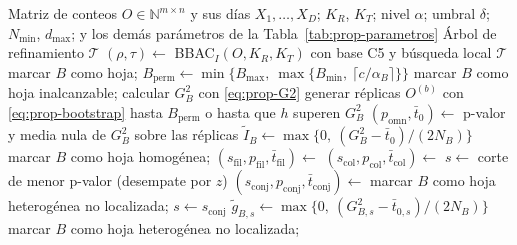 \begin{algorithm}[t]
\caption{Refinamiento jerárquico de ST-CC con AST-CC}\label{alg:astcc}
\begin{algorithmic}[1]
\Require Matriz de conteos $O\in\mathbb{N}^{m\times n}$ y sus días $X_1,\dots,X_D$; $K_R$, $K_T$; nivel $\alpha$; umbral $\delta$; $N_{\min}$, $d_{\max}$; y los demás parámetros de la Tabla~\ref{tab:prop-parametros}
\Ensure Árbol de refinamiento $\mathcal{T}$
\State $(\rho,\tau)\gets$ BBAC$_I(O, K_R, K_T)$ con base C5 y búsqueda local 
  \State {}
\EndFor
\State \Return $\mathcal{T}$
\Statex
{}
    \State marcar $B$ como hoja; \Return
  \EndIf
  \State $B_{\mathrm{perm}}\gets\min\{B_{\max},\ \max\{B_{\min},\ \lceil c/\alpha_B\rceil\}\}$
    \State marcar $B$ como hoja inalcanzable; \Return
  \EndIf
  \State calcular $G^2_B$ con \eqref{eq:prop-G2}
  \State generar réplicas $O^{(b)}$ con \eqref{eq:prop-bootstrap} hasta $B_{\mathrm{perm}}$ o hasta que $h$ superen $G^2_B$ 
  \State $(p_{\mathrm{omn}}, \bar t_0)\gets$ p-valor y media nula de $G^2_B$ sobre las réplicas
  \State $\tilde I_B\gets\max\{0,\ (G^2_B-\bar t_0)/(2N_B)\}$
    \State marcar $B$ como hoja homogénea; \Return
  \EndIf
  \State $(s_{\mathrm{fil}},p_{\mathrm{fil}},\bar t_{\mathrm{fil}})\gets$ 
  \State $(s_{\mathrm{col}},p_{\mathrm{col}},\bar t_{\mathrm{col}})\gets$ 
    \State $s\gets$ corte de menor p-valor (desempate por $z$)
  \Else
    \State $(s_{\mathrm{conj}},p_{\mathrm{conj}},\bar t_{\mathrm{conj}})\gets$ 
      \State marcar $B$ como hoja heterogénea no localizada; \Return
    \EndIf
    \State $s\gets s_{\mathrm{conj}}$
  \EndIf
  \State $\tilde g_{B,s}\gets\max\{0,\ (G^2_{B,s}-\bar t_{0,s})/(2N_B)\}$ 
    \State marcar $B$ como hoja heterogénea no localizada; \Return
  \EndIf
    \State {}
  \EndFor
\EndProcedure
\end{algorithmic}
\end{algorithm}

